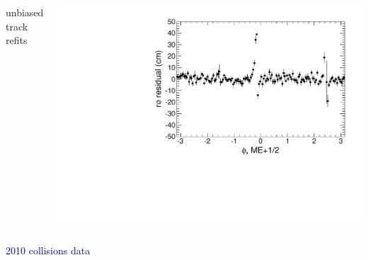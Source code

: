 \documentclass[compress]{beamer}
\begin{document}
\begin{frame}
\begin{columns}
unbiased track refits

\includegraphics[width=\linewidth]{deltax_phi_prof_mep12_norefitRPC.pdf}
\end{columns}

\vspace{-1.25 cm}
\hfill \textcolor{darkblue}{\scriptsize 2010 collisions data}
\end{frame}
\end{document}
